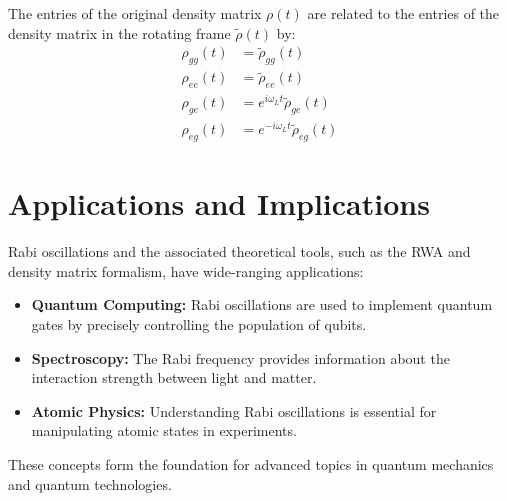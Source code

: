The entries of the original density matrix \(\rho(t)\) are related to the entries of the density matrix in the rotating frame \(\tilde{\rho}(t)\) by:
\begin{align}
	\rho_{gg}(t) & = \tilde{\rho}_{gg}(t) \label{eq:RecoveryGG}                  \\
	\rho_{ee}(t) & = \tilde{\rho}_{ee}(t) \label{eq:RecoveryEE}                  \\
	\rho_{ge}(t) & = e^{i\omega_L t} \tilde{\rho}_{ge}(t) \label{eq:RecoveryGE}  \\
	\rho_{eg}(t) & = e^{-i\omega_L t} \tilde{\rho}_{eg}(t) \label{eq:RecoveryEG}
\end{align}


\section{Applications and Implications}

Rabi oscillations and the associated theoretical tools, such as the RWA and density matrix formalism, have wide-ranging applications:
\begin{itemize}
	\item \textbf{Quantum Computing:} Rabi oscillations are used to implement quantum gates by precisely controlling the population of qubits.
	\item \textbf{Spectroscopy:} The Rabi frequency provides information about the interaction strength between light and matter.
	\item \textbf{Atomic Physics:} Understanding Rabi oscillations is essential for manipulating atomic states in experiments.
\end{itemize}

These concepts form the foundation for advanced topics in quantum mechanics and quantum technologies.
